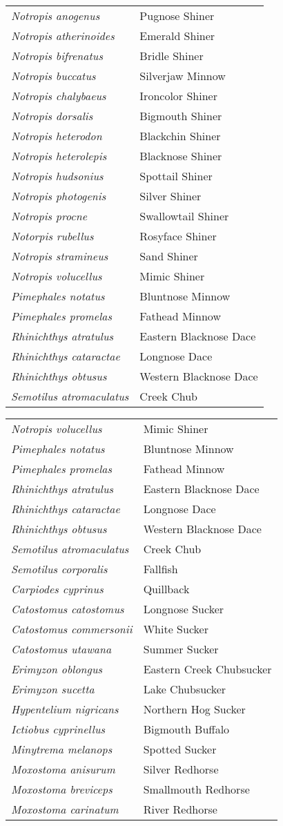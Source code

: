 \documentclass[11pt]{article}
\begin{document}
\vspace{\baselineskip}

%
\textbf{\Student}

\begin{tabular}{@{}L{3in}L{3in}@{}}
\textit{Notropis anogenus} & Pugnose Shiner\tabularnewline
\textit{Notropis atherinoides} & Emerald Shiner\tabularnewline
\textit{Notropis bifrenatus} & Bridle Shiner\tabularnewline
\textit{Notropis buccatus} & Silverjaw Minnow\tabularnewline
\textit{Notropis chalybaeus} & Ironcolor Shiner\tabularnewline
\textit{Notropis dorsalis} & Bigmouth Shiner\tabularnewline
\textit{Notropis heterodon} & Blackchin Shiner\tabularnewline
\textit{Notropis heterolepis} & Blacknose Shiner\tabularnewline
\textit{Notropis hudsonius} & Spottail Shiner\tabularnewline
\textit{Notropis photogenis} & Silver Shiner\tabularnewline
\textit{Notropis procne} & Swallowtail Shiner\tabularnewline
\textit{Notorpis rubellus} & Rosyface Shiner\tabularnewline
\textit{Notropis stramineus} & Sand Shiner\tabularnewline
\textit{Notropis volucellus} & Mimic Shiner\tabularnewline
\textit{Pimephales notatus} & Bluntnose Minnow\tabularnewline
\textit{Pimephales promelas} & Fathead Minnow\tabularnewline
\textit{Rhinichthys atratulus} & Eastern Blacknose Dace\tabularnewline
\textit{Rhinichthys cataractae} & Longnose Dace\tabularnewline
\textit{Rhinichthys obtusus} & Western Blacknose Dace\tabularnewline
\textit{Semotilus atromaculatus} & Creek Chub\tabularnewline
\end{tabular}

\newpage

\vspace{\baselineskip}

%
\textbf{\Student}

\begin{tabular}{@{}L{3in}L{3in}@{}}
\textit{Notropis volucellus} & Mimic Shiner\tabularnewline
\textit{Pimephales notatus} & Bluntnose Minnow\tabularnewline
\textit{Pimephales promelas} & Fathead Minnow\tabularnewline
\textit{Rhinichthys atratulus} & Eastern Blacknose Dace\tabularnewline
\textit{Rhinichthys cataractae} & Longnose Dace\tabularnewline
\textit{Rhinichthys obtusus} & Western Blacknose Dace\tabularnewline
\textit{Semotilus atromaculatus} & Creek Chub\tabularnewline
\textit{Semotilus corporalis} & Fallfish\tabularnewline
\textit{Carpiodes cyprinus} & Quillback\tabularnewline
\textit{Catostomus catostomus} & Longnose Sucker\tabularnewline
\textit{Catostomus commersonii} & White Sucker\tabularnewline
\textit{Catostomus utawana} & Summer Sucker\tabularnewline
\textit{Erimyzon oblongus} & Eastern Creek Chubsucker\tabularnewline
\textit{Erimyzon sucetta} & Lake Chubsucker\tabularnewline
\textit{Hypentelium nigricans} & Northern Hog Sucker\tabularnewline
\textit{Ictiobus cyprinellus} & Bigmouth Buffalo\tabularnewline
\textit{Minytrema melanops} & Spotted Sucker\tabularnewline
\textit{Moxostoma anisurum} & Silver Redhorse\tabularnewline
\textit{Moxostoma breviceps} & Smallmouth Redhorse\tabularnewline
\textit{Moxostoma carinatum} & River Redhorse\tabularnewline
\end{tabular}
\end{document}
